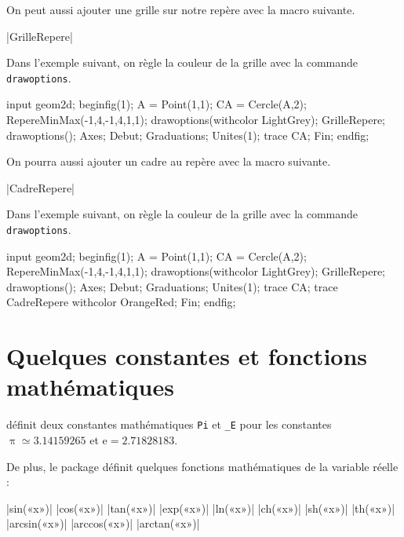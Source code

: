 \documentclass[a4paper,french]{article}
\begin{document}
On peut aussi ajouter une grille sur notre repère avec la macro suivante.
\begin{colourband}
\macro|GrilleRepere|
\end{colourband}
Dans l'exemple suivant, on règle la couleur de la grille avec la commande
 \lstinline+drawoptions+.
\begin{ExempleMP}
input geom2d;
beginfig(1);
A = Point(1,1);
CA = Cercle(A,2);
RepereMinMax(-1,4,-1,4,1,1);
drawoptions(withcolor LightGrey);
GrilleRepere;
drawoptions();
Axes;
Debut;
  Graduations;
  Unites(1);
  trace CA;
Fin;
endfig;
\end{ExempleMP}
On pourra aussi ajouter un cadre au repère avec la macro suivante.
\begin{colourband}
  \macro|CadreRepere|
\end{colourband}
  Dans l'exemple suivant, on règle la couleur de la grille avec la commande
   \lstinline+drawoptions+.
  \begin{ExempleMP}
input geom2d;
beginfig(1);
A = Point(1,1);
CA = Cercle(A,2);
RepereMinMax(-1,4,-1,4,1,1);
drawoptions(withcolor LightGrey);
GrilleRepere;
drawoptions();
Axes;
Debut;
  Graduations;
  Unites(1);
  trace CA;
  trace CadreRepere withcolor OrangeRed;
Fin;
endfig;
  \end{ExempleMP}

\section{Quelques constantes et fonctions mathématiques}

\mpgeomdd définit deux constantes mathématiques \lstinline+Pi+ et \lstinline+_E+
 pour les constantes
$\uppi\simeq 3.14159265$ et $\mathrm{e}=2.71828183$.

De plus, le package définit quelques fonctions mathématiques de la variable
réelle :
\begin{colourband}
\macro|sin(«x»)| 
\macro|cos(«x»)| 
\macro|tan(«x»)| 
\macro|exp(«x»)| 
\macro|ln(«x»)|  
\macro|ch(«x»)| 
\macro|sh(«x»)| 
\macro|th(«x»)| 
\macro|arcsin(«x»)| 
\macro|arccos(«x»)| 
\macro|arctan(«x»)|  
\end{colourband}
\end{document}
